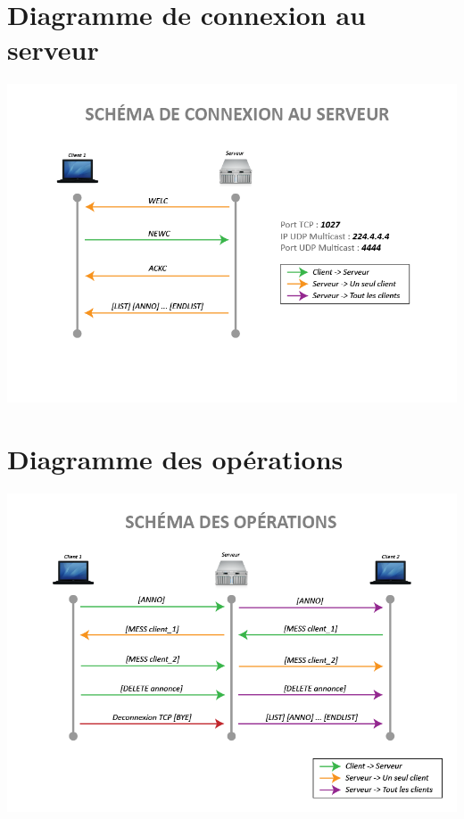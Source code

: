 \documentclass[12pt]{article}
\begin{document}
\section{Diagramme de connexion au serveur}

\includegraphics[width=\textwidth]{rendu1/Protocole_Connection.png}

\section{Diagramme des opérations}

\includegraphics[width=\textwidth]{rendu1/Protocole_Operations.png}
\end{document}
